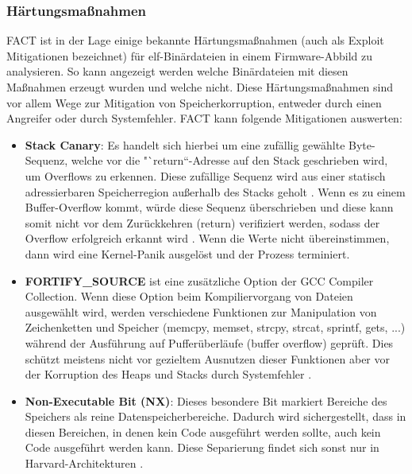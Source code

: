 \documentclass[a4paper]{book}
\begin{document}
\begin{large}
\subsubsection{Härtungsmaßnahmen}
\label{Hardening}
\begin{onehalfspace}

FACT ist in der Lage einige bekannte Härtungsmaßnahmen (auch als Exploit Mitigationen bezeichnet) für elf-Binärdateien in einem Firmware-Abbild zu analysieren. So kann angezeigt werden welche Binärdateien mit diesen Maßnahmen erzeugt wurden und welche nicht. Diese Härtungsmaßnahmen sind vor allem Wege zur Mitigation von Speicherkorruption, entweder durch einen Angreifer oder durch Systemfehler. FACT kann folgende Mitigationen auswerten:

\begin{itemize}
\item \textbf{Stack Canary}: Es handelt sich hierbei um eine zufällig gewählte Byte-Sequenz, welche vor die "`return“-Adresse auf den Stack geschrieben wird, um Overflows zu erkennen. Diese zufällige Sequenz wird aus einer statisch adressierbaren Speicherregion außerhalb des Stacks geholt \cite{RubenGonzalez.29.04.2019}. Wenn es zu einem Buffer-Overflow kommt, würde diese Sequenz überschrieben und diese kann somit nicht vor dem Zurückkehren (return) verifiziert werden, sodass der Overflow erfolgreich erkannt wird \cite{xorl.2010}. Wenn die Werte nicht übereinstimmen, dann wird eine Kernel-Panik ausgelöst und der Prozess terminiert. 

\item \textbf{FORTIFY\_SOURCE} ist eine zusätzliche Option der GCC Compiler Collection. Wenn diese Option beim Kompiliervorgang von Dateien ausgewählt wird, werden verschiedene Funktionen zur Manipulation von Zeichenketten und Speicher (memcpy, memset, strcpy, strcat, sprintf, gets, ...) während der Ausführung auf Pufferüberläufe (buffer overflow) geprüft. Dies schützt meistens nicht vor gezieltem Ausnutzen dieser Funktionen aber vor der Korruption des Heaps und Stacks durch Systemfehler \cite{SiddharthSharma.2014}.  

\item \textbf{Non-Executable Bit (NX)}: Dieses besondere Bit markiert Bereiche des Speichers als reine Datenspeicherbereiche. Dadurch wird sichergestellt, dass in diesen Bereichen, in denen kein Code ausgeführt werden sollte, auch kein Code ausgeführt werden kann. Diese Separierung findet sich sonst nur in Harvard-Architekturen \cite[p.~11]{PeterWeidenbachJohannesvomDorp.2020}.


\end{itemize}
\end{onehalfspace}
\end{large}
\end{document}
